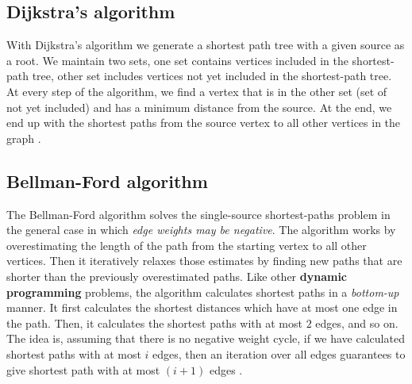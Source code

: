 \documentclass[a4paper]{article}
\begin{document}
\subsection{Dijkstra's algorithm}
With Dijkstra's algorithm we generate a shortest path tree with a given source as a root. We maintain two sets, one set contains vertices included in the shortest-path tree, other set includes vertices not yet included in the shortest-path tree. At every step of the algorithm, we find a vertex that is in the other set (set of not yet included) and has a minimum distance from the source.
At the end, we end up with the shortest paths from the source vertex to all other vertices in the graph \cite{dijkstraG4G,dijkstraProgrammiz,huang-et.al:2009}.

\subsection{Bellman-Ford algorithm}
The Bellman-Ford algorithm solves the single-source shortest-paths problem in the general case in which \emph{edge weights may be negative}. The algorithm works by overestimating the length of the path from the starting vertex to all other vertices. Then it iteratively relaxes those estimates by finding new paths that are shorter than the previously overestimated paths.
Like other \textbf{dynamic programming} problems, the algorithm calculates shortest paths in a \emph{bottom-up} manner. It first calculates the shortest distances which have at most one edge in the path. Then, it calculates the shortest paths with at most $2$ edges, and so on. The idea is, assuming that there is no negative weight cycle, if we have calculated shortest paths with at most \(i\) edges, then an iteration over all edges guarantees to give shortest path with at most $(i+1)$ edges \cite{bFordG4G,bFordProgrammiz}.

\newpage

\end{document}
